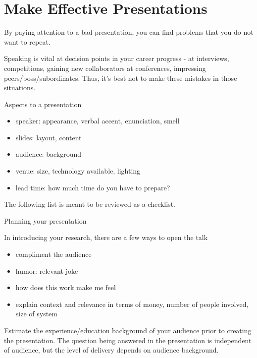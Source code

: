 \section{Make Effective Presentations\label{sec:presentations}}


By paying attention to a bad presentation, you can find problems that you do not want to repeat.

Speaking is vital at decision points in your career progress - at interviews, competitions, gaining new collaborators at conferences, impressing peers/boss/subordinates. Thus, it's best not to make these mistakes in those situations.

Aspects to a presentation
\begin{itemize}
    \item speaker: appearance, verbal accent, enunciation, smell
    \item slides: layout, content
    \item audience: background
    \item venue: size, technology available, lighting
    \item lead time: how much time do you have to prepare?
\end{itemize}
The following list is meant to be reviewed as a checklist.

Planning your presentation

In introducing your research, there are a few ways to open the talk
\begin{itemize}
    \item compliment the audience
    \item humor: relevant joke
    \item how does this work make me feel
    \item explain context and relevance in terms of money, number of people involved, size of system
\end{itemize}
Estimate the experience/education background of your audience prior to creating the presentation. The question being answered in the presentation is independent of audience, but the level of delivery depends on audience background.


